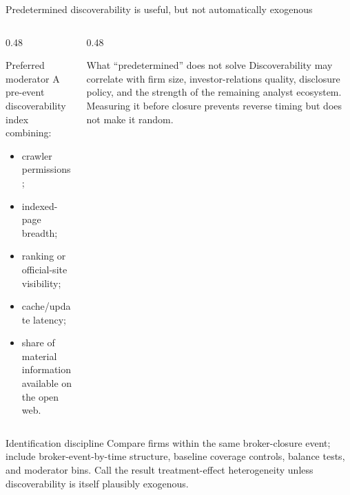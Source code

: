 \documentclass[aspectratio=169,10pt]{beamer}
\newcommand{\tightitems}{\setlength\itemsep{0.11cm}\setlength\parskip{0pt}}
\begin{document}
\begin{frame}[t]{Predetermined discoverability is useful, but not automatically exogenous}
\begin{columns}[T,onlytextwidth]
  \begin{column}{0.48\textwidth}
    \begin{block}{Preferred moderator}
    \footnotesize
    A pre-event discoverability index combining:
    \begin{itemize}\tightitems
      \item crawler permissions;
      \item indexed-page breadth;
      \item ranking or official-site visibility;
      \item cache/update latency;
      \item share of material information available on the open web.
    \end{itemize}
    \end{block}
  \end{column}
  \begin{column}{0.48\textwidth}
    \begin{alertblock}{What ``predetermined'' does not solve}
    \footnotesize
    Discoverability may correlate with firm size, investor-relations quality, disclosure policy, and the strength of the remaining analyst ecosystem. Measuring it before closure prevents reverse timing but does not make it random.
    \end{alertblock}
  \end{column}
\end{columns}

\begin{exampleblock}{Identification discipline}
\scriptsize Compare firms within the same broker-closure event; include broker-event-by-time structure, baseline coverage controls, balance tests, and moderator bins. Call the result treatment-effect heterogeneity unless discoverability is itself plausibly exogenous.
\end{exampleblock}
\end{frame}
\end{document}
